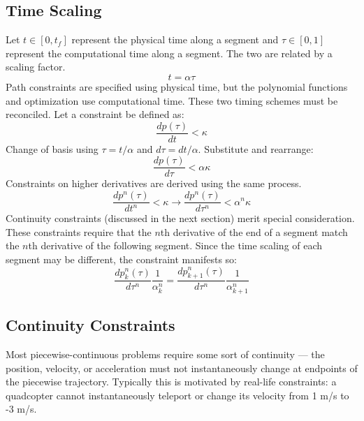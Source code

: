 \documentclass[12pt]{article}
\begin{document}
\subsection{Time Scaling}
Let $t \in [0, t_{f}]$ represent the physical time along a segment and $\tau \in
[0, 1]$ represent the computational time along a segment. The two are related by
a scaling factor.
%
\begin{equation}
  t = \alpha \tau
\end{equation}
%
Path constraints are specified using physical time, but the polynomial functions
and optimization use computational time. These two timing schemes must be
reconciled. Let a constraint be defined as:
%
\begin{equation*}
  \frac{dp(\tau)}{dt} < \kappa
\end{equation*}
%
Change of basis using $\tau = t / \alpha$ and $d\tau = dt / \alpha$. Substitute
and rearrange:
%
\begin{equation}
  \frac{dp(\tau)}{d\tau} < \alpha \kappa
\end{equation}
%
Constraints on higher derivatives are derived using the same process.
\begin{equation}
  \frac{dp^{n}(\tau)}{dt^{n}} < \kappa \rightarrow
  \frac{dp^{n}(\tau)}{d\tau^{n}} < \alpha^{n} \kappa
\end{equation}
%
Continuity constraints (discussed in the next section) merit special
consideration. These constraints require that the $n$th derivative of the end of
a segment match the $n$th derivative of the following segment. Since the time
scaling of each segment may be different, the constraint manifests so:
\begin{equation}
  \frac{dp_{k}^{n}(\tau)}{d\tau^{n}} \frac{1}{\alpha_{k}^{n}} =
  \frac{dp_{k+1}^{n}(\tau)}{d\tau^{n}} \frac{1}{\alpha_{k+1}^{n}}
\end{equation}

\subsection{Continuity Constraints}
Most piecewise-continuous problems require some sort of continuity --- the
position, velocity, or acceleration must not instantaneously change at endpoints
of the piecewise trajectory. Typically this is motivated by real-life
constraints: a quadcopter cannot instantaneously teleport or change its
velocity from 1 m/s to -3 m/s.
\end{document}
